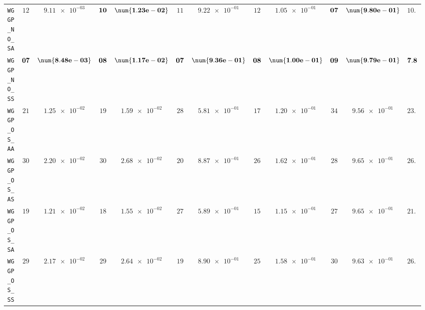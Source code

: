 \begin{xltabular}{\textwidth}{l||cC|cC|cC|cC|cC||c}
	\texttt{WGGP\_NO\_SA} & $ 12$ & $ \num{9.11e-03}$ & $\bf 10$ & $\bf \num{1.23e-02}$ & $ 11$ & $ \num{9.22e-01}$ & $ 12$ & $ \num{1.05e-01}$ & $\bf 07$ & $\bf \num{9.80e-01}$ & $ 10.4$  \\
	\texttt{WGGP\_NO\_SS} & $\bf 07$ & $\bf \num{8.48e-03}$ & $\bf 08$ & $\bf \num{1.17e-02}$ & $\bf 07$ & $\bf \num{9.36e-01}$ & $\bf 08$ & $\bf \num{1.00e-01}$ & $\bf 09$ & $\bf \num{9.79e-01}$ & $\bf 7.8$  \\
	\texttt{WGGP\_OS\_AA} & $ 21$ & $ \num{1.25e-02}$ & $ 19$ & $ \num{1.59e-02}$ & $ 28$ & $ \num{5.81e-01}$ & $ 17$ & $ \num{1.20e-01}$ & $ 34$ & $ \num{9.56e-01}$ & $ 23.8$  \\
	\texttt{WGGP\_OS\_AS} & $ 30$ & $ \num{2.20e-02}$ & $ 30$ & $ \num{2.68e-02}$ & $ 20$ & $ \num{8.87e-01}$ & $ 26$ & $ \num{1.62e-01}$ & $ 28$ & $ \num{9.65e-01}$ & $ 26.8$  \\
	\texttt{WGGP\_OS\_SA} & $ 19$ & $ \num{1.21e-02}$ & $ 18$ & $ \num{1.55e-02}$ & $ 27$ & $ \num{5.89e-01}$ & $ 15$ & $ \num{1.15e-01}$ & $ 27$ & $ \num{9.65e-01}$ & $ 21.2$  \\
	\texttt{WGGP\_OS\_SS} & $ 29$ & $ \num{2.17e-02}$ & $ 29$ & $ \num{2.64e-02}$ & $ 19$ & $ \num{8.90e-01}$ & $ 25$ & $ \num{1.58e-01}$ & $ 30$ & $ \num{9.63e-01}$ & $ 26.4$  \\

\end{xltabular}
